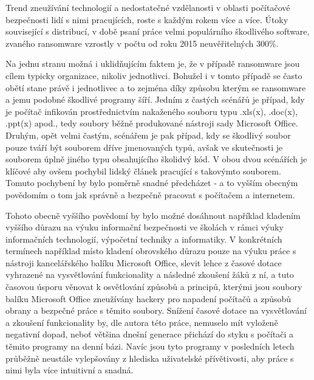 \documentclass[a4paper, 11pt]{article}
\begin{document}
Trend zneužívání technologií a nedostatečné vzdělanosti v oblasti počítačové bezpečnosti lidí s nimi pracujících, roste s každým rokem více a více. Útoky související s distribucí, v době psaní práce velmi populárního škodlivého software, zvaného ransomware vzrostly v počtu od roku 2015 neuvěřitelných 300$\%$.

Na jednu stranu možná i uklidňujícím faktem je, že v případě ransomware jsou cílem typicky organizace, nikoliv jednotlivci. Bohužel i v tomto případě se často obětí stane právě i jednotlivec a to zejména díky způsobu kterým se ransomware a jemu podobné škodlivé programy šíří. Jedním z častých scénářů je případ, kdy je počítač infikován prostřednictvím nakaženého souboru typu .xls(x), .doc(x), .ppt(x) apod., tedy soubory běžně produkované nástroji sady Microsoft Office. Druhým, opět velmi častým, scénářem je pak případ, kdy se škodlivý soubor pouze tváří být souborem dříve jmenovaných typů, avšak ve skutečnosti je souborem úplně jiného typu obsahujícího školidvý kód. V obou dvou scénářích je klíčové aby ovšem pochybil lidský článek pracující s takovýmto souborem. Tomuto pochybení by bylo poměrně snadné předcházet - a to vyšším obecným povědomím o tom jak správně a bezpečně pracovat s počítačem a internetem. 

Tohoto obecně vyššího povědomí by bylo možné dosáhnout například kladením vyššího důrazu na výuku informační bezpečnosti ve školách v rámci výuky informačních technologií, výpočetní techniky a informatiky. V konkrétních termínech například místo kladení obrovského důrazu pouze na výuku práce s nástroji kancelářského balíku Microsoft Office, slevit lehce z časové dotace vyhrazené na vysvětlování funkcionality a následné zkoušení žáků z ní, a tuto časovou úsporu věnovat k osvětlování způsobů a principů, kterými jsou soubory balíku Microsoft Office zneužívány hackery pro napadení počítačů a způsobů obrany a bezpečné práce s těmito soubory. Snížení časové dotace na vysvětlování a zkoušení funkcionality by, dle autora této práce, nemuselo mít vyloženě negativní dopad, neboť většina dnešní generace přichází do styku s počítači a těmito programy na denní bázi. Navíc jsou tyto programy v posledních letech průběžně neustále vylepšovány z hlediska uživatelské přívětivosti, aby práce s nimi byla více intuitivní a snadná. 
\end{document}
